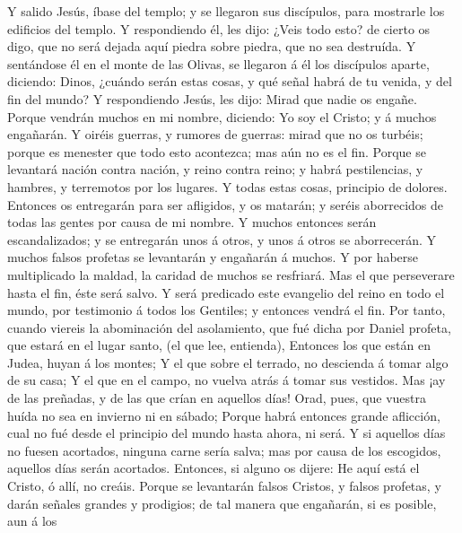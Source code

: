  Y salido Jesús, íbase del templo; y se llegaron sus
discípulos, para mostrarle los edificios del templo.  Y
respondiendo él, les dijo: ¿Veis todo esto? de cierto os digo, que no
será dejada aquí piedra sobre piedra, que no sea destruída. 
Y sentándose él en el monte de las Olivas, se llegaron á él los
discípulos aparte, diciendo: Dinos, ¿cuándo serán estas cosas, y qué
señal habrá de tu venida, y del fin del mundo?  Y
respondiendo Jesús, les dijo: Mirad que nadie os engañe. 
Porque vendrán muchos en mi nombre, diciendo: Yo soy el Cristo; y á
muchos engañarán.  Y oiréis guerras, y rumores de guerras:
mirad que no os turbéis; porque es menester que todo esto acontezca; mas
aún no es el fin.  Porque se levantará nación contra nación,
y reino contra reino; y habrá pestilencias, y hambres, y terremotos por
los lugares.  Y todas estas cosas, principio de dolores.
 Entonces os entregarán para ser afligidos, y os matarán; y
seréis aborrecidos de todas las gentes por causa de mi nombre.
 Y muchos entonces serán escandalizados; y se entregarán
unos á otros, y unos á otros se aborrecerán.  Y muchos
falsos profetas se levantarán y engañarán á muchos.  Y por
haberse multiplicado la maldad, la caridad de muchos se resfriará.
 Mas el que perseverare hasta el fin, éste será salvo.
 Y será predicado este evangelio del reino en todo el
mundo, por testimonio á todos los Gentiles; y entonces vendrá el fin.
 Por tanto, cuando viereis la abominación del asolamiento,
que fué dicha por Daniel profeta, que estará en el lugar santo, (el que
lee, entienda),  Entonces los que están en Judea, huyan á
los montes;  Y el que sobre el terrado, no descienda á
tomar algo de su casa;  Y el que en el campo, no vuelva
atrás á tomar sus vestidos.  Mas ¡ay de las preñadas, y de
las que crían en aquellos días!  Orad, pues, que vuestra
huída no sea en invierno ni en sábado;  Porque habrá
entonces grande aflicción, cual no fué desde el principio del mundo
hasta ahora, ni será.  Y si aquellos días no fuesen
acortados, ninguna carne sería salva; mas por causa de los escogidos,
aquellos días serán acortados.  Entonces, si alguno os
dijere: He aquí está el Cristo, ó allí, no creáis.  Porque
se levantarán falsos Cristos, y falsos profetas, y darán señales grandes
y prodigios; de tal manera que engañarán, si es posible, aun á los
